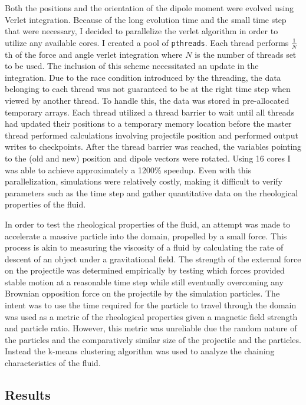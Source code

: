 Both the positions and the orientation of the dipole moment were
evolved using Verlet integration. Because of the long evolution time
and the small time step that were necessary, I decided to parallelize
the verlet algorithm in order to utilize any available cores. I
created a pool of {\tt pthreads}.  Each thread performs $\frac1N$th of
the force and angle verlet integration where $N$ is the number of
threads set to be used. The inclusion of this scheme necessitated an
update in the integration. Due to the race condition introduced by the
threading, the data belonging to each thread was not guaranteed to be
at the right time step when viewed by another thread.  To handle this,
the data was stored in pre-allocated temporary arrays.  Each thread
utilized a thread barrier to wait until all threads had updated their
positions to a temporary memory location before the master thread
performed calculations involving projectile position and performed
output writes to checkpoints.  After the thread barrier was reached,
the variables pointing to the (old and new) position and dipole
vectors were rotated. Using 16 cores I was able to achieve
approximately a 1200\% speedup.  Even with this parallelization,
simulations were relatively costly, making it difficult to verify
parameters such as the time step and gather quantitative data on the
rheological properties of the fluid.

In order to test the rheological properties of the fluid, an attempt
was made to accelerate a massive particle into the domain, propelled
by a small force.  This process is akin to measuring the viscosity of
a fluid by calculating the rate of descent of an object under a
gravitational field. The strength of the external force on the
projectile was determined empirically by testing which forces provided
stable motion at a reasonable time step while still eventually
overcoming any Brownian opposition force on the projectile by the
simulation particles. The intent was to use the time required for the
particle to travel through the domain was used as a metric of the
rheological properties given a magnetic field strength and particle
ratio. However, this metric was unreliable due the random nature of
the particles and the comparatively similar size of the projectile and
the particles.  Instead the k-means clustering algorithm was used to
analyze the chaining characteristics of the fluid.

\subsection*{Results}

